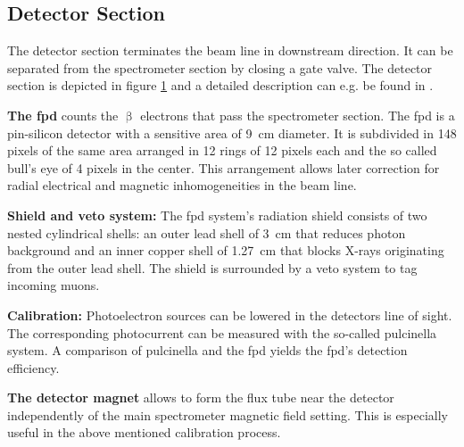 \subsection{Detector Section}
\label{sec:detector}
\begin{figure}[t]
 \label{fig:detector}
\end{figure}

The detector section terminates the beam line in downstream direction. It can be separated from the spectrometer section by closing a gate valve. The detector section is depicted in figure \ref{fig:detector} and a detailed description can e.g. be found in \cite{Amsbaugh2015}.

{\par \textbf{The \gls{fpd}} counts the $\upbeta$ electrons that pass the spectrometer section. The \gls{fpd} is a pin-silicon detector with a sensitive area of \SI{9}{cm} diameter. It is subdivided in 148 pixels of the same area arranged in 12 rings of 12 pixels each and the so called bull's eye of 4 pixels in the center. This arrangement allows later correction for radial electrical and magnetic inhomogeneities in the beam line.}

{\par \textbf{Shield and veto system:} The \gls{fpd} system's radiation shield consists of two nested cylindrical shells: an outer lead shell of \SI{3}{cm} that reduces photon background and an inner copper shell of \SI{1.27}{cm} that blocks X-rays originating from the outer lead shell. The shield is surrounded by a veto system to tag incoming muons.}

{\par \textbf{Calibration:} Photoelectron sources can be lowered in the detectors line of sight. The corresponding photocurrent can be measured with the so-called \gls{pulcinella} system. A comparison of \gls{pulcinella} and the \gls{fpd} yields the \gls{fpd}'s detection efficiency.}

{\par \textbf{The detector magnet} allows to form the flux tube near the detector independently of the main spectrometer magnetic field setting. This is especially useful in the above mentioned calibration process.}

